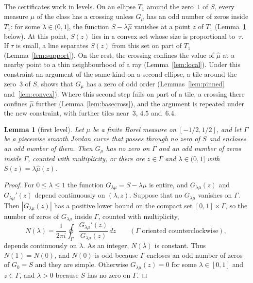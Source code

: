 \documentclass[11pt]{amsart}
\newtheorem{lemma}[theorem]{Lemma}
\theoremstyle{definition}
\theoremstyle{remark}
\numberwithin{equation}{section}
\begin{document}
The certificates work in levels. On an ellipse $T_1$ around the zero~$1$ of $S$, every measure $\mu$ of the class has a crossing unless $G_\mu$ has an odd number of zeros inside $T_1$: for some $\lambda\in(0,1]$, the function $S-\lambda\hat\mu$ vanishes at a point $z$ of $T_1$ (Lemma~\ref{lem:crossing} below). At this point, $S(z)$ lies in a convex set whose size is proportional to~$\tau$. If $\tau$ is small, a line separates $S(z)$ from this set on part of $T_1$ (Lemma~\ref{lem:support}). On the rest, the crossing confines the value of $\hat\mu$ at a nearby point to a thin neighbourhood of a ray (Lemma~\ref{lem:local}). Under this constraint an argument of the same kind on a second ellipse, a tile around the zero~$3$ of $S$, shows that $G_\mu$ has a zero of odd order (Lemmas~\ref{lem:pinned} and~\ref{lem:convex}). Where this second step fails on part of a tile, a crossing there confines $\hat\mu$ further (Lemma~\ref{lem:basecross}), and the argument is repeated under the new constraint, with further tiles near~$3$, $4.5$ and~$6.4$.

\begin{lemma}[first level]\label{lem:crossing}
Let $\mu$ be a finite Borel measure on $[-1/2,1/2]$, and let $\Gamma$ be a piecewise smooth Jordan curve that passes through no zero of $S$ and encloses an odd number of them. Then $G_\mu$ has no zero on $\Gamma$ and an odd number of zeros inside $\Gamma$, counted with multiplicity, or there are $z\in\Gamma$ and $\lambda\in(0,1]$ with $S(z)=\lambda\hat\mu(z)$.
\end{lemma}

\begin{proof}
For $0\le\lambda\le1$ the function $G_{\lambda\mu}=S-\lambda\hat\mu$ is entire, and $G_{\lambda\mu}(z)$ and $G_{\lambda\mu}'(z)$ depend continuously on $(\lambda,z)$. Suppose that no $G_{\lambda\mu}$ vanishes on $\Gamma$. Then $|G_{\lambda\mu}(z)|$ has a positive lower bound on the compact set $[0,1]\times\Gamma$, so the number of zeros of $G_{\lambda\mu}$ inside $\Gamma$, counted with multiplicity,
\[
N(\lambda)=\frac1{2\pi i}\oint_\Gamma\frac{G_{\lambda\mu}'(z)}{G_{\lambda\mu}(z)}\,dz\qquad(\Gamma\text{ oriented counterclockwise}),
\]
depends continuously on $\lambda$. As an integer, $N(\lambda)$ is constant. Thus $N(1)=N(0)$, and $N(0)$ is odd because $\Gamma$ encloses an odd number of zeros of $G_0=S$ and they are simple. Otherwise $G_{\lambda\mu}(z)=0$ for some $\lambda\in[0,1]$ and $z\in\Gamma$, and $\lambda>0$ because $S$ has no zero on $\Gamma$.
\end{proof}
\end{document}
